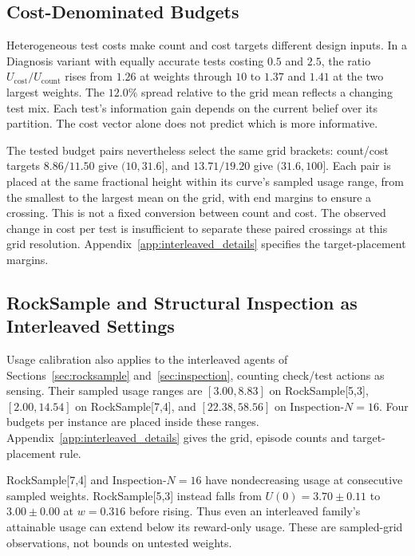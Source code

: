 \documentclass[manuscript, screen, review]{jair}
\begin{document}
\subsection{Cost-Denominated Budgets}
\label{sec:cost_budget}

Heterogeneous test costs make count and cost targets different design inputs. In a Diagnosis variant with equally accurate tests costing $0.5$ and $2.5$, the ratio $U_{\mathrm{cost}}/U_{\mathrm{count}}$ rises from $1.26$ at weights through $10$ to $1.37$ and $1.41$ at the two largest weights. The $12.0\%$ spread relative to the grid mean reflects a changing test mix. Each test's information gain depends on the current belief over its partition. The cost vector alone does not predict which is more informative.

The tested budget pairs nevertheless select the same grid brackets: count/cost targets $8.86/11.50$ give $(10,31.6]$, and $13.71/19.20$ give $(31.6,100]$. Each pair is placed at the same fractional height within its curve's sampled usage range, from the smallest to the largest mean on the grid, with end margins to ensure a crossing. This is not a fixed conversion between count and cost. The observed change in cost per test is insufficient to separate these paired crossings at this grid resolution. Appendix~\ref{app:interleaved_details} specifies the target-placement margins.

\subsection{RockSample and Structural Inspection as Interleaved Settings}
\label{sec:interleaved_budget}

Usage calibration also applies to the interleaved agents of Sections~\ref{sec:rocksample} and~\ref{sec:inspection}, counting check/test actions as sensing. Their sampled usage ranges are $[3.00,8.83]$ on RockSample[5,3], $[2.00,14.54]$ on RockSample[7,4], and $[22.38,58.56]$ on Inspection-$N=16$. Four budgets per instance are placed inside these ranges. Appendix~\ref{app:interleaved_details} gives the grid, episode counts and target-placement rule.

RockSample[7,4] and Inspection-$N=16$ have nondecreasing usage at consecutive sampled weights. RockSample[5,3] instead falls from $U(0)=3.70\pm0.11$ to $3.00\pm0.00$ at $w=0.316$ before rising. Thus even an interleaved family's attainable usage can extend below its reward-only usage. These are sampled-grid observations, not bounds on untested weights.
\end{document}
